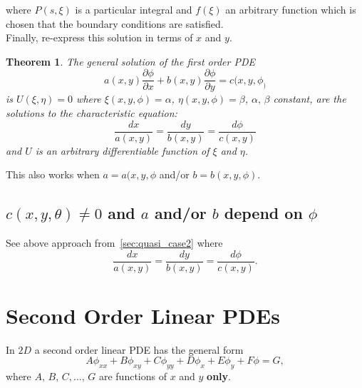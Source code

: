 \documentclass{article}
\newtheorem{theorem}{Theorem}
\begin{document}
where $P(s,\xi)$ is a particular integral and $f(\xi)$ an arbitrary function which is chosen that the boundary conditions are satisfied.\\
Finally, re-express this solution in terms of $x$ and $y$.
\begin{theorem}
    The general solution of the first order PDE 
    \begin{equation}
        a(x,y)\frac{\partial\phi}{\partial x} + b(x,y)\frac{\partial\phi}{\partial y} = c(x,y,\phi_)
    \end{equation}
    is $U(\xi,\eta) = 0$ where $\xi(x,y,\phi) = \alpha$, $\eta(x,y,\phi) = \beta$, $\alpha,\,\beta$ constant, are the solutions to the characteristic equation:
    \begin{equation}
        \frac{dx}{a(x,y)} = \frac{dy}{b(x,y)} = \frac{d\phi}{c(x,y)}
    \end{equation}
    and $U$ is an arbitrary differentiable function of $\xi$ and $\eta$.
\end{theorem}
This also works when $a = a(x,y,\phi$ and/or $b = b(x,y,\phi)$.

\subsection{$c(x,y,\theta)\neq0$ and $a$ and/or $b$ depend on $\phi$}
See above approach from~\ref{sec:quasi_case2} where 
\begin{equation}
    \frac{dx}{a(x,y)} = \frac{dy}{b(x,y)} = \frac{d\phi}{c(x,y)}.
\end{equation}



\section{Second Order Linear PDEs}
In $2D$ a second order linear PDE has the general form
\begin{equation}
    A\phi_{xx} + B\phi_{xy} + C\phi_{yy} + D\phi_x + E\phi_y + F\phi = G,\label{eq:SecondOrderGeneral}
\end{equation}
where $A,\,B,\,C,\ldots,\,G$ are functions of $x$ and $y$ \textbf{only}.
\end{document}
